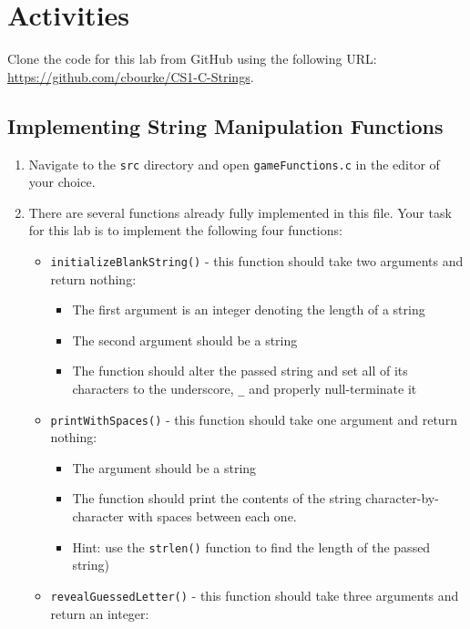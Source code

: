 \documentclass[12pt]{scrartcl}
\begin{document}
\section{Activities}

Clone the code for this lab from GitHub using the following URL: 
\url{https://github.com/cbourke/CS1-C-Strings}.

\subsection{Implementing String Manipulation Functions}

\begin{enumerate}
  \item Navigate to the \texttt{src} directory and open 
  	\texttt{gameFunctions.c} in the editor of your choice.
  \item There are several functions already fully implemented in this file.  
	Your task for this lab is to implement the following four functions:
	\begin{itemize}
	  \item \texttt{initializeBlankString()} - this function should
	  take two arguments and return nothing:
	  \begin{itemize}
	    \item The first argument is an integer denoting the length of a string
	    \item The second argument should be a string
	    \item The function should alter the passed string and set all of
	    its characters to the underscore, \texttt{_} and properly
	    null-terminate it
	  \end{itemize}
	  \item \texttt{printWithSpaces()} - this function should take
	  one argument and return nothing:
	  \begin{itemize}
	    \item The argument should be a string
	    \item The function should print the contents of the string 
	    character-by-character with spaces between each one.
	    \item Hint: use the \texttt{strlen()} function to find 
	  the length of the passed string)
	  \end{itemize}
	  \item \texttt{revealGuessedLetter()} - this function should
	  take three arguments and return an integer:

\end{itemize}
\end{enumerate}
\end{document}
